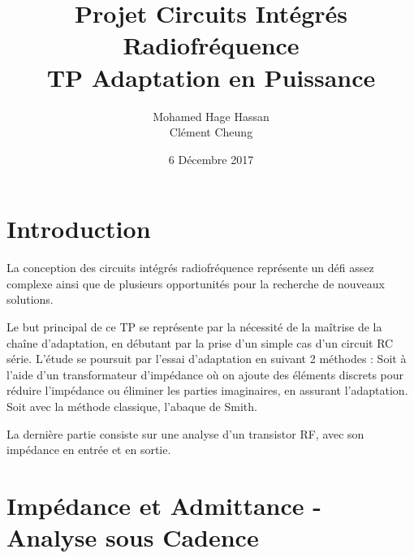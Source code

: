 \documentclass[a4paper]{article}
\begin{document}
\newcommand\textstyleEmphasis[1]{\textit{#1}}
\renewcommand{\contentsname}{Table des mati\`eres}
\renewcommand\refname{R\'ef\'erences}

\renewcommand{\abstractname}{Pr\'eambule}
\title{\textbf{Projet Circuits Int\'egr\'es Radiofr\'equence \\ TP Adaptation en Puissance}}
\author{Mohamed Hage Hassan \\ Cl\'ement Cheung}
\date{6 D\'ecembre 2017}
\maketitle
\thispagestyle{empty}

\tableofcontents
\clearpage

\section*{Introduction}

La conception des circuits int\'egr\'es radiofr\'equence repr\'esente un d\'efi assez
complexe ainsi que de plusieurs opportunit\'es pour la recherche de nouveaux solutions.

Le but principal de ce TP se repr\'esente par la n\'ecessit\'e de la ma\^itrise de la
cha\^ine d'adaptation, en d\'ebutant par la prise d'un simple cas d'un circuit RC s\'erie.
L'\'etude se poursuit par l'essai d'adaptation en suivant 2 m\'ethodes : Soit \`a l'aide
d'un transformateur d'imp\'edance o\`u on ajoute des \'el\'ements discrets pour r\'eduire
l'imp\'edance ou \'eliminer les parties imaginaires, en assurant l'adaptation. Soit avec la
m\'ethode classique, l'abaque de Smith.

La derni\`ere partie consiste sur une analyse d'un transistor RF, avec son imp\'edance en
entr\'ee et en sortie.

\section{Imp\'edance et Admittance - Analyse sous Cadence}
\end{document}
